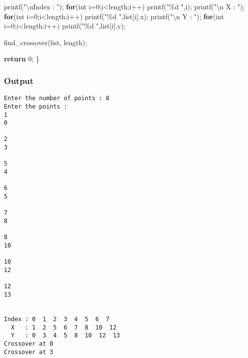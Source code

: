 \documentclass[
]{article}
\newenvironment{Shaded}{}{}
\newcommand{\ControlFlowTok}[1]{\textcolor[rgb]{0.00,0.44,0.13}{\textbf{#1}}}
\newcommand{\DataTypeTok}[1]{\textcolor[rgb]{0.56,0.13,0.00}{#1}}
\newcommand{\DecValTok}[1]{\textcolor[rgb]{0.25,0.63,0.44}{#1}}
\newcommand{\NormalTok}[1]{#1}
\newcommand{\OperatorTok}[1]{\textcolor[rgb]{0.40,0.40,0.40}{#1}}
\newcommand{\SpecialCharTok}[1]{\textcolor[rgb]{0.25,0.44,0.63}{#1}}
\newcommand{\StringTok}[1]{\textcolor[rgb]{0.25,0.44,0.63}{#1}}
\begin{document}
\begin{Shaded}
\begin{Highlighting}[]
\NormalTok{        printf}\OperatorTok{(}\StringTok{"}\SpecialCharTok{\textbackslash{}n}\StringTok{Index : "}\OperatorTok{);}
        \ControlFlowTok{for}\OperatorTok{(}\DataTypeTok{int}\NormalTok{ i}\OperatorTok{=}\DecValTok{0}\OperatorTok{;}\NormalTok{i}\OperatorTok{\textless{}}\NormalTok{length}\OperatorTok{;}\NormalTok{i}\OperatorTok{++)}
\NormalTok{                printf}\OperatorTok{(}\StringTok{"\%d  "}\OperatorTok{,}\NormalTok{i}\OperatorTok{);}
\NormalTok{        printf}\OperatorTok{(}\StringTok{"}\SpecialCharTok{\textbackslash{}n}\StringTok{  X   : "}\OperatorTok{);}
        \ControlFlowTok{for}\OperatorTok{(}\DataTypeTok{int}\NormalTok{ i}\OperatorTok{=}\DecValTok{0}\OperatorTok{;}\NormalTok{i}\OperatorTok{\textless{}}\NormalTok{length}\OperatorTok{;}\NormalTok{i}\OperatorTok{++)}
\NormalTok{                printf}\OperatorTok{(}\StringTok{"\%d  "}\OperatorTok{,}\NormalTok{list}\OperatorTok{[}\NormalTok{i}\OperatorTok{].}\NormalTok{x}\OperatorTok{);}
\NormalTok{        printf}\OperatorTok{(}\StringTok{"}\SpecialCharTok{\textbackslash{}n}\StringTok{  Y   : "}\OperatorTok{);}
        \ControlFlowTok{for}\OperatorTok{(}\DataTypeTok{int}\NormalTok{ i}\OperatorTok{=}\DecValTok{0}\OperatorTok{;}\NormalTok{i}\OperatorTok{\textless{}}\NormalTok{length}\OperatorTok{;}\NormalTok{i}\OperatorTok{++)}
\NormalTok{                printf}\OperatorTok{(}\StringTok{"\%d  "}\OperatorTok{,}\NormalTok{list}\OperatorTok{[}\NormalTok{i}\OperatorTok{].}\NormalTok{y}\OperatorTok{);}

\NormalTok{        find\_crossover}\OperatorTok{(}\NormalTok{list}\OperatorTok{,}\NormalTok{ length}\OperatorTok{);}

        \ControlFlowTok{return} \DecValTok{0}\OperatorTok{;}
\OperatorTok{\}}
\end{Highlighting}
\end{Shaded}

\hypertarget{output}{%
\subsubsection{Output}\label{output}}

\begin{verbatim}
Enter the number of points : 8
Enter the points : 
1
0

2
3

5
4

6
5

7
8

8
10

10
12

12
13


Index : 0  1  2  3  4  5  6  7  
  X   : 1  2  5  6  7  8  10  12  
  Y   : 0  3  4  5  8  10  12  13  
Crossover at 0
Crossover at 3    
\end{verbatim}

\newpage
\end{document}
